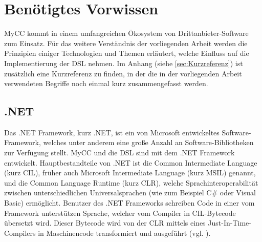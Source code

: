 \newpage

\section{Benötigtes Vorwissen}
MyCC kommt in einem umfangreichen Ökosystem von Drittanbieter-Software zum Einsatz. Für das weitere Verständnis der vorliegenden Arbeit werden die Prinzipien einiger Technologien und Themen erläutert, welche Einfluss auf die Implementierung der DSL nehmen. Im Anhang (siehe \ref{sec:Kurzreferenz}) ist zusätzlich eine Kurzreferenz zu finden, in der die in der vorliegenden Arbeit verwendeten Begriffe noch einmal kurz zusammengefasst werden.

\subsection{.NET}
\label{subsec:DotNet}
Das .NET Framework, kurz .NET, ist ein von Microsoft entwickeltes Software-Framework, welches unter anderem eine große Anzahl an Software-Bibliotheken zur Verfügung stellt. MyCC und die DSL sind mit dem .NET Framework entwickelt. Hauptbestandteile von .NET ist die Common Intermediate Language (kurz CIL), früher auch Microsoft Intermediate Language (kurz MSIL) genannt, und die Common Language Runtime (kurz CLR), welche Sprachinteroperabilität zwischen unterschiedlichen Universalsprachen (wie zum Beispiel C\# oder Visual Basic) ermöglicht. Benutzer des .NET Frameworks schreiben Code in einer vom Framework unterstützen Sprache, welcher vom Compiler in CIL-Bytecode übersetzt wird. Dieser Bytecode wird von der CLR mittels eines Just-In-Time-Compilers in Maschinencode transformiert und ausgeführt (vgl. \cite[S. 16ff]{Platt:03}).

